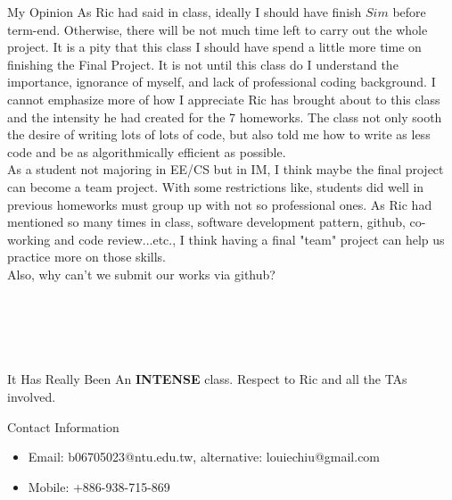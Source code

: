 \documentclass[12pt,a4paper]{report}
\begin{document}
\begin{section}{My Opinion}
  As Ric had said in class, ideally I should have finish $Sim$ before term-end. Otherwise, there will
  be not much time left to carry out the whole project. It is a pity that this class I should have spend
  a little more time on finishing the Final Project. It is not until this class do I understand the 
  importance, ignorance of myself, and lack of professional coding background. I cannot emphasize more
  of how I appreciate Ric has brought about to this class and the intensity he had created for the 
  7 homeworks. The class not only sooth the desire of writing lots of lots of code, but also told me
  how to write as less code and be as algorithmically efficient as possible.\\
  As a student not majoring in EE/CS but in IM, I think maybe the final project can become a team project.
  With some restrictions like, students did well in previous homeworks must group up with not so professional
  ones. As Ric had mentioned so many times in class, software development pattern, github, co-working and code review...etc.,
  I think having a final "team" project can help us practice more on those skills.\\
  Also, why can't we submit our works via github?\\
  \\\\\\\\\\
  It Has Really Been An \textbf{INTENSE} class. Respect to Ric and all the TAs involved.
\end{section}
\begin{section}{Contact Information}
  \begin{itemize}
    \item Email: b06705023@ntu.edu.tw, alternative: louiechiu@gmail.com
    \item Mobile: +886-938-715-869
  \end{itemize}
  \end{section}
\end{document}
